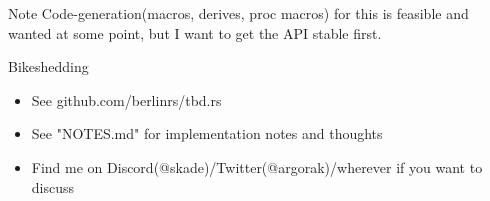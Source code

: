 \documentclass{beamer}
\begin{document}
\begin{frame}{Note}
  Code-generation(macros, derives, proc macros) for this is feasible and wanted at some point, but I want to get the API stable first.
\end{frame}

\begin{frame}{Bikeshedding}
  \begin{itemize}
    \item See github.com/berlinrs/tbd.rs
    \item See "NOTES.md" for implementation notes and thoughts
    \item Find me on Discord(@skade)/Twitter(@argorak)/wherever if you want to discuss
  \end{itemize}
\end{frame}
\end{document}
